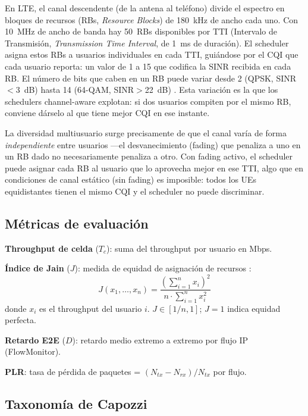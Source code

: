 \documentclass[conference]{IEEEtran}
\begin{document}
En LTE, el canal descendente (de la antena al teléfono) divide el espectro en bloques
de recursos (RBs, \emph{Resource Blocks}) de 180~kHz de ancho cada uno. Con 10~MHz
de ancho de banda hay 50~RBs disponibles por TTI (Intervalo de Transmisión,
\emph{Transmission Time Interval}, de 1~ms de duración). El scheduler
asigna estos RBs a usuarios individuales en cada TTI, guiándose por el CQI que cada
usuario reporta: un valor de 1 a 15 que codifica la SINR recibida en cada RB.
El número de bits que caben en un RB puede variar desde 2 (QPSK, SINR$<$3~dB) hasta
14 (64-QAM, SINR$>$22~dB) \cite{lte3gpp}. Esta variación es la que los schedulers
channel-aware explotan: si dos usuarios compiten por el mismo RB, conviene dárselo
al que tiene mejor CQI en ese instante.

La diversidad multiusuario surge precisamente de que el canal varía de forma
\emph{independiente} entre usuarios ---el desvanecimiento (fading) que penaliza a uno
en un RB dado no necesariamente penaliza a otro. Con fading activo, el scheduler
puede asignar cada RB al usuario que lo aprovecha mejor en ese TTI, algo que en
condiciones de canal estático (sin fading) es imposible: todos los UEs equidistantes
tienen el mismo CQI y el scheduler no puede discriminar.

\subsection{Métricas de evaluación}

\textbf{Throughput de celda} ($T_c$): suma del throughput por usuario en Mbps.

\textbf{Índice de Jain} ($J$): medida de equidad de asignación de recursos \cite{jain1984}:
\begin{equation}
  J(x_1,\ldots,x_n) = \frac{\left(\sum_{i=1}^{n} x_i\right)^2}{n \cdot \sum_{i=1}^{n} x_i^2}
  \label{eq:jain}
\end{equation}
donde $x_i$ es el throughput del usuario $i$. $J \in [1/n, 1]$; $J=1$ indica equidad perfecta.

\textbf{Retardo E2E} ($D$): retardo medio extremo a extremo por flujo IP (FlowMonitor).

\textbf{PLR}: tasa de pérdida de paquetes = $(N_{tx}-N_{rx})/N_{tx}$ por flujo.

\subsection{Taxonomía de Capozzi}
\end{document}
